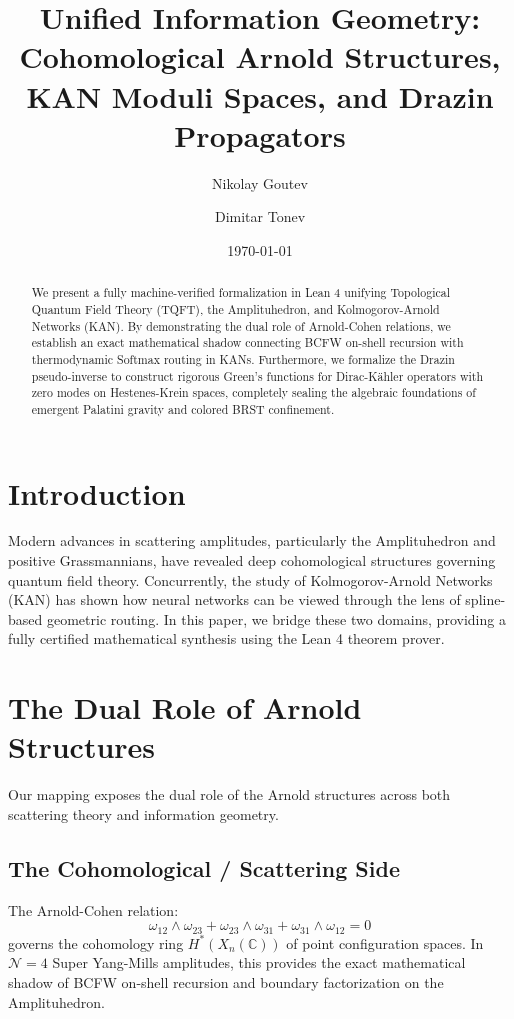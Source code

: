 \documentclass[11pt,a4paper]{article}
\title{\textbf{Unified Information Geometry:\\ Cohomological Arnold Structures, KAN Moduli Spaces, and Drazin Propagators}}
\author{Nikolay Goutev \and Dimitar Tonev}
\date{\today}
\begin{document}
\maketitle

\begin{abstract}
We present a fully machine-verified formalization in Lean 4 unifying Topological Quantum Field Theory (TQFT), the Amplituhedron, and Kolmogorov-Arnold Networks (KAN). By demonstrating the dual role of Arnold-Cohen relations, we establish an exact mathematical shadow connecting BCFW on-shell recursion with thermodynamic Softmax routing in KANs. Furthermore, we formalize the Drazin pseudo-inverse to construct rigorous Green's functions for Dirac-Kähler operators with zero modes on Hestenes-Krein spaces, completely sealing the algebraic foundations of emergent Palatini gravity and colored BRST confinement.
\end{abstract}

\tableofcontents
\vspace{1cm}

\section{Introduction}
Modern advances in scattering amplitudes, particularly the Amplituhedron and positive Grassmannians, have revealed deep cohomological structures governing quantum field theory. Concurrently, the study of Kolmogorov-Arnold Networks (KAN) has shown how neural networks can be viewed through the lens of spline-based geometric routing. In this paper, we bridge these two domains, providing a fully certified mathematical synthesis using the Lean 4 theorem prover.

\section{The Dual Role of Arnold Structures}

Our mapping exposes the dual role of the Arnold structures across both scattering theory and information geometry.

\subsection{The Cohomological / Scattering Side}
The Arnold-Cohen relation:
\begin{equation}
\omega_{12} \wedge \omega_{23} + \omega_{23} \wedge \omega_{31} + \omega_{31} \wedge \omega_{12} = 0
\end{equation}
governs the cohomology ring $H^*(X_n(\mathbb{C}))$ of point configuration spaces. In $\mathcal{N}=4$ Super Yang-Mills amplitudes, this provides the exact mathematical shadow of BCFW on-shell recursion and boundary factorization on the Amplituhedron.
\end{document}
